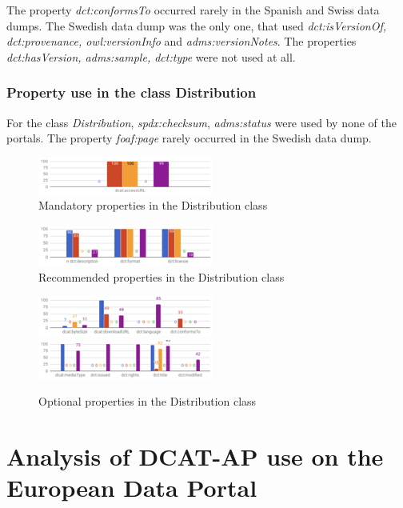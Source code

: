 \documentclass[<options>]{elsarticle}
\begin{document}
The property \textit{dct:conformsTo} occurred rarely in the Spanish and Swiss data dumps. The Swedish data dump was the only one, that used \textit{dct:isVersionOf, dct:provenance, owl:versionInfo} and \textit{adms:versionNotes}. The properties  \textit{dct:hasVersion, adms:sample, dct:type} were not used at all.

\subsubsection{Property use in the class Distribution}
For the class \textit{Distribution}, \textit{spdx:checksum}, \textit{adms:status} were used by none of the portals. The property \textit{foaf:page} rarely occurred in the Swedish data dump.

\begin{figure}[H]
\includegraphics{replace12.png}
\caption{Mandatory properties in the Distribution class}
\end{figure}

\begin{figure}[H]
\includegraphics{replace13.png}
\caption{Recommended properties in the Distribution class}
\end{figure}

\begin{figure}[H]
\includegraphics{replace14.png}
\includegraphics{replace15.png}
\caption{Optional properties in the Distribution class}
\end{figure}

\section{Analysis of DCAT-AP use on the European Data Portal}
\end{document}
